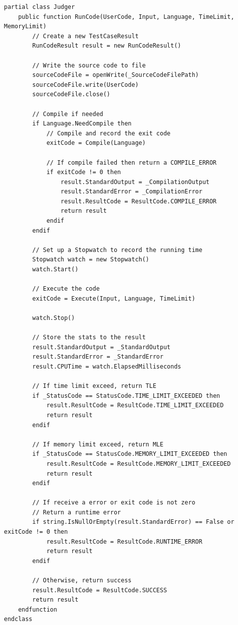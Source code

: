 \documentclass[a4paper]{report}
\begin{document}
\begin{verbatim}
partial class Judger
    public function RunCode(UserCode, Input, Language, TimeLimit, MemoryLimit)
        // Create a new TestCaseResult
        RunCodeResult result = new RunCodeResult()

        // Write the source code to file
        sourceCodeFile = openWrite(_SourceCodeFilePath)
        sourceCodeFile.write(UserCode)
        sourceCodeFile.close()

        // Compile if needed
        if Language.NeedCompile then
            // Compile and record the exit code
            exitCode = Compile(Language)

            // If compile failed then return a COMPILE_ERROR
            if exitCode != 0 then
                result.StandardOutput = _CompilationOutput
                result.StandardError = _CompilationError
                result.ResultCode = ResultCode.COMPILE_ERROR
                return result
            endif
        endif

        // Set up a Stopwatch to record the running time
        Stopwatch watch = new Stopwatch()
        watch.Start()

        // Execute the code
        exitCode = Execute(Input, Language, TimeLimit)

        watch.Stop()

        // Store the stats to the result
        result.StandardOutput = _StandardOutput
        result.StandardError = _StandardError
        result.CPUTime = watch.ElapsedMilliseconds

        // If time limit exceed, return TLE
        if _StatusCode == StatusCode.TIME_LIMIT_EXCEEDED then
            result.ResultCode = ResultCode.TIME_LIMIT_EXCEEDED
            return result
        endif

        // If memory limit exceed, return MLE
        if _StatusCode == StatusCode.MEMORY_LIMIT_EXCEEDED then
            result.ResultCode = ResultCode.MEMORY_LIMIT_EXCEEDED
            return result
        endif

        // If receive a error or exit code is not zero
        // Return a runtime error
        if string.IsNullOrEmpty(result.StandardError) == False or exitCode != 0 then
            result.ResultCode = ResultCode.RUNTIME_ERROR
            return result
        endif

        // Otherwise, return success
        result.ResultCode = ResultCode.SUCCESS
        return result
    endfunction
endclass
\end{verbatim}
\end{document}
